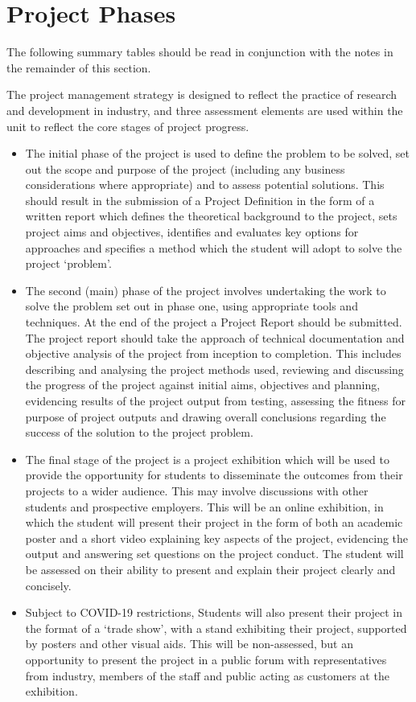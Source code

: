 \chapter{Project Phases}

The following summary tables should be read in conjunction with the notes in the remainder of this section.

The project management strategy is designed to reflect the practice of research and development in industry, and three assessment elements are used within the unit to reflect the core stages of project progress.

\begin{itemize}
    \item The initial phase of the project is used to define the problem to be solved, set out the scope and purpose of the project (including any business considerations where appropriate) and to assess potential solutions. This should result in the submission of a Project Definition in the form of a written report which defines the theoretical background to the project, sets project aims and objectives, identifies and evaluates key options for approaches and specifies a method which the student will adopt to solve the project ‘problem’.
    \item The second (main) phase of the project involves undertaking the work to solve the problem set out in phase one, using appropriate tools and techniques. At the end of the project a Project Report should be submitted. The project report should take the approach of technical documentation and objective analysis of the project from inception to completion. This includes describing and analysing the project methods used, reviewing and discussing the progress of the project against initial aims, objectives and planning, evidencing results of the project output from testing, assessing the fitness for purpose of project outputs and drawing overall conclusions regarding the success of the solution to the project problem.
    \item The final stage of the project is a project exhibition which will be used to provide the opportunity for students to disseminate the outcomes from their projects to a wider audience. This may involve discussions with other students and prospective employers. This will be an online exhibition, in which the student will present their project in the form of both an academic poster and a short video explaining key aspects of the project, evidencing the output and answering set questions on the project conduct. The student will be assessed on their ability to present and explain their project clearly and concisely.
    \item Subject to COVID-19 restrictions, Students will also present their project in the format of a ‘trade show’, with a stand exhibiting their project, supported by posters and other visual aids. This will be non-assessed, but an opportunity to present the project in a public forum with representatives from industry, members of the staff and public acting as customers at the exhibition.
\end{itemize}


